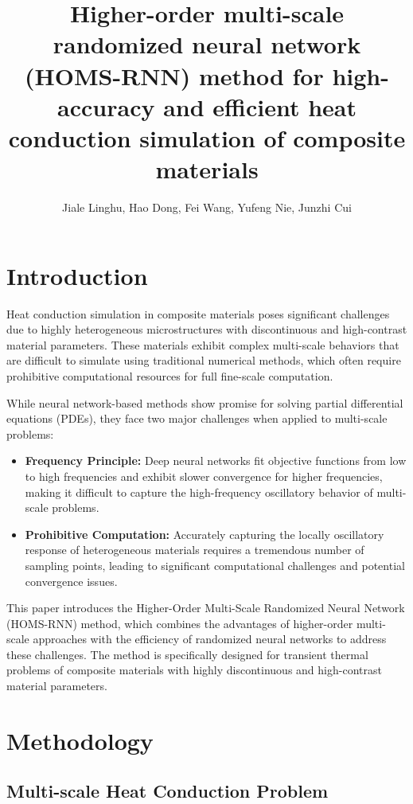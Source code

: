 \documentclass[11pt]{article}
\title{Higher-order multi-scale randomized neural network (HOMS-RNN) method for high-accuracy and efficient heat conduction simulation of composite materials}
\author{Jiale Linghu, Hao Dong, Fei Wang, Yufeng Nie, Junzhi Cui}
\date{}
\begin{document}
\maketitle

\section{Introduction}

Heat conduction simulation in composite materials poses significant challenges due to highly heterogeneous microstructures with discontinuous and high-contrast material parameters. These materials exhibit complex multi-scale behaviors that are difficult to simulate using traditional numerical methods, which often require prohibitive computational resources for full fine-scale computation.

While neural network-based methods show promise for solving partial differential equations (PDEs), they face two major challenges when applied to multi-scale problems:
\begin{itemize}
    \item \textbf{Frequency Principle:} Deep neural networks fit objective functions from low to high frequencies and exhibit slower convergence for higher frequencies, making it difficult to capture the high-frequency oscillatory behavior of multi-scale problems.
    \item \textbf{Prohibitive Computation:} Accurately capturing the locally oscillatory response of heterogeneous materials requires a tremendous number of sampling points, leading to significant computational challenges and potential convergence issues.
\end{itemize}

This paper introduces the Higher-Order Multi-Scale Randomized Neural Network (HOMS-RNN) method, which combines the advantages of higher-order multi-scale approaches with the efficiency of randomized neural networks to address these challenges. The method is specifically designed for transient thermal problems of composite materials with highly discontinuous and high-contrast material parameters.

\section{Methodology}

\subsection{Multi-scale Heat Conduction Problem}
\end{document}
